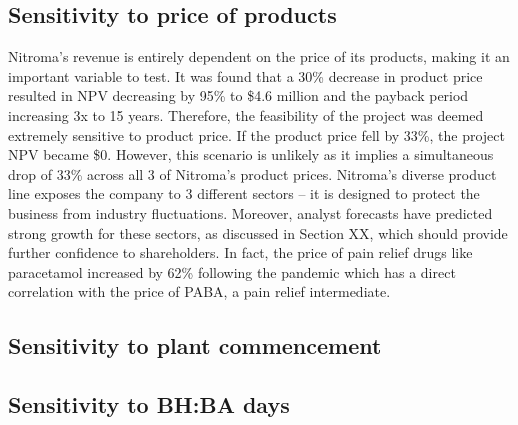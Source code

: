 \subsection{Sensitivity to price of products}
Nitroma’s revenue is entirely dependent on the price of its products, making it an important variable to test. It was found that a 30\% decrease in product price resulted in NPV decreasing by 95\% to \$4.6 million and the payback period increasing 3x to 15 years. Therefore, the feasibility of the project was deemed extremely sensitive to product price.  If the product price fell by 33\%, the project NPV became \$0. However, this scenario is unlikely as it implies a simultaneous drop of 33\% across all 3 of Nitroma’s product prices. Nitroma’s diverse product line exposes the company to 3 different sectors – it is designed to protect the business from industry fluctuations. Moreover, analyst forecasts have predicted strong growth for these sectors, as discussed in Section XX, which should provide further confidence to shareholders. In fact, the price of pain relief drugs like paracetamol increased by 62\% following the pandemic which has a direct correlation with the price of PABA, a pain relief intermediate.

\subsection{Sensitivity to plant commencement}


\subsection{Sensitivity to BH:BA days}